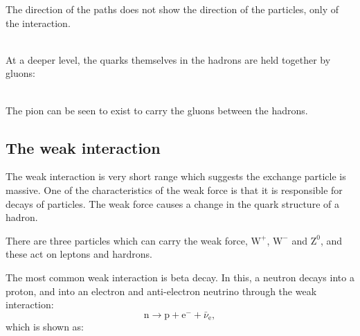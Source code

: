 \documentclass[a4paper,12pt]{article}
\begin{document}
\noindent \begin{minipage}{0.5\textwidth}
\end{minipage}
\begin{minipage}{0.5\textwidth}
The direction of the paths does not show the direction of the particles, only of the interaction.
\end{minipage}\\

At a deeper level, the quarks themselves in the hadrons are held together by gluons:\\

\\

The pion can be seen to exist to carry the gluons between the hadrons.

\subsection{The weak interaction}

The weak interaction is very short range which suggests the exchange particle is massive.  One of the characteristics of the weak force is that it is responsible for decays of particles.  The weak force causes a change in the quark structure of a hadron.

There are three particles which can carry the weak force, $\mathrm{W}^{+}$, $\mathrm{W}^{-}$ and $\mathrm{Z}^{0}$, and these act on leptons and hardrons.

The most common weak interaction is beta decay.  In this, a neutron decays into a proton, and into an electron and anti-electron neutrino through the weak interaction:
\[\mathrm{n}\longrightarrow\mathrm{p}+\mathrm{e}^{-}+\bar{\nu}_\mathrm{e},\]
which is shown as:\\
\end{document}
